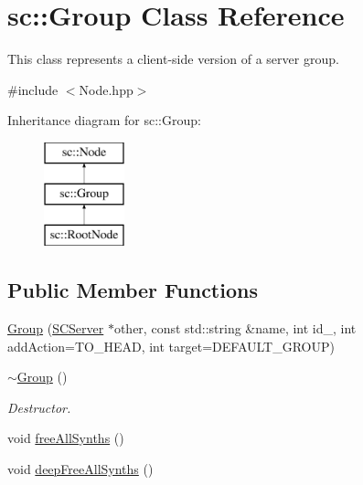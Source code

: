 \hypertarget{classsc_1_1Group}{\section{sc\-:\-:Group Class Reference}
\label{classsc_1_1Group}
}


This class represents a client-\/side version of a server group.  




{\ttfamily \#include $<$Node.\-hpp$>$}

Inheritance diagram for sc\-:\-:Group\-:\begin{figure}[H]
\begin{center}
\leavevmode
\includegraphics[height=3.000000cm]{classsc_1_1Group}
\end{center}
\end{figure}
\subsection*{Public Member Functions}
\begin{DoxyCompactItemize}
\item 
\hyperlink{classsc_1_1Group_a091ad4312c030cd0cde27ef2aac7cbbd}{Group} (\hyperlink{classsc_1_1SCServer}{S\-C\-Server} $\ast$other, const std\-::string \&name, int id\-\_\-, int add\-Action=T\-O\-\_\-\-H\-E\-A\-D, int target=D\-E\-F\-A\-U\-L\-T\-\_\-\-G\-R\-O\-U\-P)
\item 
\hypertarget{classsc_1_1Group_a10466798a0549aa877931be7ad226d63}{\hyperlink{classsc_1_1Group_a10466798a0549aa877931be7ad226d63}{$\sim$\-Group} ()}\label{classsc_1_1Group_a10466798a0549aa877931be7ad226d63}

\begin{DoxyCompactList}\small\item\em Destructor. \end{DoxyCompactList}\item 
void \hyperlink{classsc_1_1Group_a779027324b685e67cabdc751fdc58ff2}{free\-All\-Synths} ()
\item 
void \hyperlink{classsc_1_1Group_af1a8e311e5009f5d1c72f189fa146fbf}{deep\-Free\-All\-Synths} ()
\end{DoxyCompactItemize}


